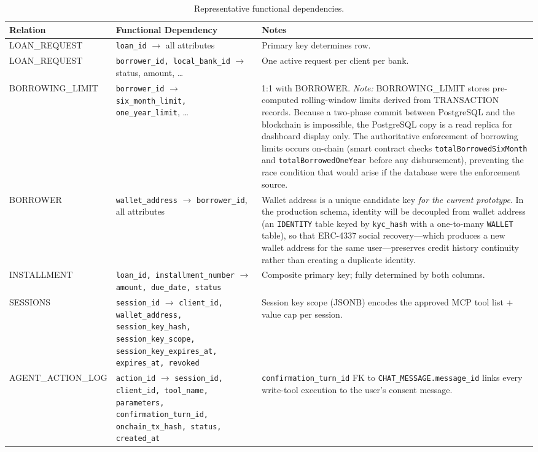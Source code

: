 \documentclass[12pt,a4paper]{report}
\begin{document}
\begin{table}[H]
\centering
\caption{Representative functional dependencies.}
\label{tab:functional-deps}
\begin{tabular}{p{3cm}p{5.5cm}p{5cm}}
\hline
\textbf{Relation} & \textbf{Functional Dependency} & \textbf{Notes} \\
\hline
LOAN\_REQUEST & \texttt{loan\_id} $\to$ all attributes & Primary key determines row. \\
\hline
LOAN\_REQUEST & \texttt{borrower\_id, local\_bank\_id} $\to$ status, amount, \ldots & One active request per client per bank. \\
\hline
BORROWING\_LIMIT & \texttt{borrower\_id} $\to$ \texttt{six\_month\_limit, one\_year\_limit}, \ldots & 1:1 with BORROWER. \textit{Note:} BORROWING\_LIMIT stores pre-computed rolling-window limits derived from TRANSACTION records. Because a two-phase commit between PostgreSQL and the blockchain is impossible, the PostgreSQL copy is a read replica for dashboard display only. The authoritative enforcement of borrowing limits occurs on-chain (smart contract checks \texttt{totalBorrowedSixMonth} and \texttt{totalBorrowedOneYear} before any disbursement), preventing the race condition that would arise if the database were the enforcement source. \\
\hline
BORROWER & \texttt{wallet\_address} $\to$ \texttt{borrower\_id}, all attributes & Wallet address is a unique candidate key \textit{for the current prototype}. In the production schema, identity will be decoupled from wallet address (an \texttt{IDENTITY} table keyed by \texttt{kyc\_hash} with a one-to-many \texttt{WALLET} table), so that ERC-4337 social recovery---which produces a new wallet address for the same user---preserves credit history continuity rather than creating a duplicate identity. \\
\hline
INSTALLMENT & \texttt{loan\_id, installment\_number} $\to$ \texttt{amount, due\_date, status} & Composite primary key; fully determined by both columns. \\
\hline
SESSIONS & \texttt{session\_id} $\to$ \texttt{client\_id, wallet\_address, session\_key\_hash,} \newline \texttt{session\_key\_scope, session\_key\_expires\_at,} \newline \texttt{expires\_at, revoked} & Session key scope (JSONB) encodes the approved MCP tool list + value cap per session. \\
\hline
AGENT\_ACTION\_LOG & \texttt{action\_id} $\to$ \texttt{session\_id, client\_id, tool\_name,} \newline \texttt{parameters, confirmation\_turn\_id,} \newline \texttt{onchain\_tx\_hash, status, created\_at} & \texttt{confirmation\_turn\_id} FK to \texttt{CHAT\_MESSAGE.message\_id} links every write-tool execution to the user's consent message. \\

\end{tabular}
\end{table}
\end{document}
